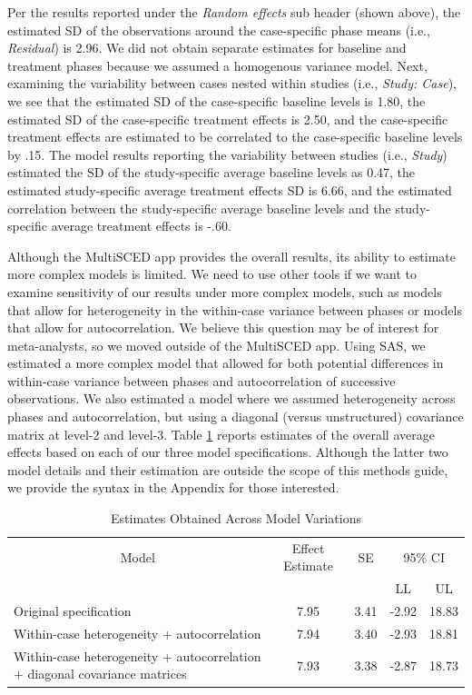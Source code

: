 \documentclass[
]{book}
\begin{document}
Per the results reported under the \emph{Random effects} sub header (shown above), the estimated SD of the observations around the case-specific phase means (i.e., \emph{Residual}) is 2.96. We did not obtain separate estimates for baseline and treatment phases because we assumed a homogenous variance model. Next, examining the variability between cases nested within studies (i.e., \emph{Study: Case}), we see that the estimated SD of the case-specific baseline levels is 1.80, the estimated SD of the case-specific treatment effects is 2.50, and the case-specific treatment effects are estimated to be correlated to the case-specific baseline levels by .15. The model results reporting the variability between studies (i.e., \emph{Study}) estimated the SD of the study-specific average baseline levels as 0.47, the estimated study-specific average treatment effects SD is 6.66, and the estimated correlation between the study-specific average baseline levels and the study-specific average treatment effects is -.60.

Although the MultiSCED app provides the overall results, its ability to estimate more complex models is limited. We need to use other tools if we want to examine sensitivity of our results under more complex models, such as models that allow for heterogeneity in the within-case variance between phases or models that allow for autocorrelation. We believe this question may be of interest for meta-analysts, so we moved outside of the MultiSCED app. Using SAS, we estimated a more complex model that allowed for both potential differences in within-case variance between phases and autocorrelation of successive observations. We also estimated a model where we assumed heterogeneity across phases and autocorrelation, but using a diagonal (versus unstructured) covariance matrix at level-2 and level-3. Table \ref{tab:ES-est-chapter7} reports estimates of the overall average effects based on each of our three model specifications. Although the latter two model details and their estimation are outside the scope of this methods guide, we provide the syntax in the Appendix for those interested.

\begin{table}

\caption{\label{tab:ES-est-chapter7}Estimates Obtained Across Model Variations}
\centering
\begin{tabular}[t]{l|c|c|c|c}
\hline
\multicolumn{1}{c|}{Model} & \multicolumn{1}{c|}{Effect Estimate} & \multicolumn{1}{c|}{SE} & \multicolumn{2}{c}{95\% CI} \\
\cline{1-1} \cline{2-2} \cline{3-3} \cline{4-5}
 &  &  & LL & UL\\
\hline
Original specification & 7.95 & 3.41 & -2.92 & 18.83\\
\hline
Within-case heterogeneity + autocorrelation & 7.94 & 3.40 & -2.93 & 18.81\\
\hline
Within-case heterogeneity + autocorrelation + diagonal covariance matrices & 7.93 & 3.38 & -2.87 & 18.73\\
\hline
\end{tabular}
\end{table}
\end{document}

